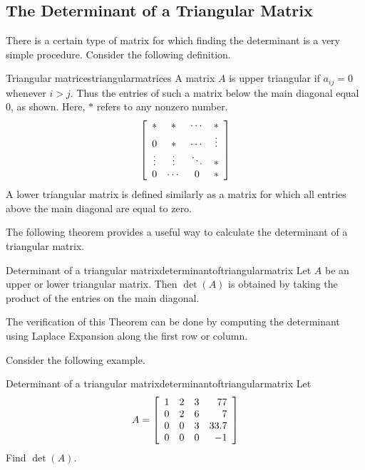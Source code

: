 \subsection{The Determinant of a Triangular Matrix}

There is a certain type of matrix for which finding the determinant is
a very simple procedure. 
Consider the following definition. 

\begin{definition}{Triangular matrices}{triangularmatrices}
A matrix $A$ is upper triangular
 if $a_{ij}=0$ whenever $i>j$. Thus the entries of such a
matrix below the main diagonal equal $0$, 
as shown. Here, $\ast$ refers to any nonzero number. 
\begin{equation*}
\left[
\begin{array}{cccc}
\ast & \ast & \cdots & \ast \\
0 & \ast & \cdots & \vdots \\
\vdots & \vdots & \ddots & \ast \\
0 & \cdots & 0 & \ast
\end{array}
\right]
\end{equation*}
A lower triangular matrix is defined similarly as a matrix for which all
entries above the
main diagonal are equal to zero.
\end{definition}

The following theorem provides a useful way to calculate the determinant
of a triangular matrix. 

\begin{theorem}{Determinant of a triangular matrix}{determinantoftriangularmatrix}
Let $A$ be an upper or lower triangular matrix. Then $\det \left( A\right) $
is obtained by taking the product of the entries on the main diagonal.
\end{theorem}

The verification of this Theorem can be done by computing the
determinant using Laplace Expansion along the first row or column. 

Consider the following example. 

\begin{example}{Determinant of a triangular matrix}{determinantoftriangularmatrix}
Let
\begin{equation*}
A=\left[
\begin{array}{rrrr}
1 & 2 & 3 & 77 \\
0 & 2 & 6 & 7 \\
0 & 0 & 3 & 33.7 \\
0 & 0 & 0 & -1
\end{array}
\right]
\end{equation*}
Find $\det \left( A\right) .$
\end{example}

